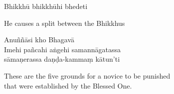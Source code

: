 Bhikkhū bhikkhūhi bhedeti

\begin{cprenglish}
  He causes a split between the Bhikkhus
\end{cprenglish}

Anuññāsi kho Bhagavā\\
Imehi pañcahi aṅgehi samannāgatassa\\
sāmaṇerassa daṇḍa-kammaṃ kātun'ti

\begin{cprenglish}
  These are the five grounds for a novice to be punished\\
  that were established by the Blessed One.
\end{cprenglish}


